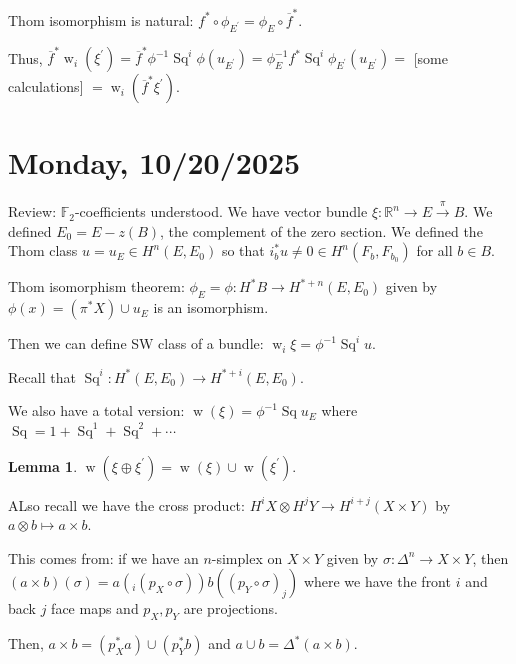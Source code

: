 \documentclass{article}
\theoremstyle{definition}
\newtheorem{lemma}[theorem]{Lemma}
\begin{document}
    Thom isomorphism is natural: \(f^{\ast} \circ \phi_{E^{\prime}} = \phi_E \circ \overline{f}^{\ast}\).
    
    Thus, \(\overline{f}^{\ast} \operatorname{w}_i(\xi^{\prime}) = \overline{f}^{\ast} \phi ^{-1} \operatorname{Sq}^i \phi(u_{E^{\prime}}) = \phi_E ^{-1} f^{\ast} \operatorname{Sq}^i \phi_{E^{\prime}}(u_{E^{\prime}}) =\) [some calculations] \(=\operatorname{w}_i(\overline{f}^{\ast} \xi ^{\prime} )\).

    \section*{Monday, 10/20/2025}
    
    Review: \(\mathbb{F}_2\)-coefficients understood. We have vector bundle \(\xi: \mathbb{R}^n \to E \xrightarrow{\pi} B\). We defined \(E_0 = E - z(B)\), the complement of the zero section. We defined the Thom class \(u = u_E \in H^n(E,E_0)\) so that \(i_b^{\ast} u \neq 0 \in H^n(F_b , F_{b_0})\) for all \(b\in B\).
    
    Thom isomorphism theorem: \(\phi_E = \phi : H^{\ast} B \to H^{\ast + n} (E,E_0)\) given by \(\phi(x) = (\pi^{\ast} X) \cup u_E\) is an isomorphism.

    Then we can define SW class of a bundle: \(\operatorname{w} _i \xi = \phi ^{-1} \operatorname{Sq}^i u\).

    Recall that \(\operatorname{Sq}^i: H^{\ast} (E,E_0) \to H^{\ast + i} (E, E_0)\).

    We also have a total version: \(\operatorname{w} (\xi) = \phi ^{-1} \operatorname{Sq} u_E\) where \(\operatorname{Sq} = 1 + \operatorname{Sq}^1 + \operatorname{Sq}^2 + \cdots\)

    \begin{lemma}
        \(\operatorname{w} (\xi \oplus \xi^{\prime}) = \operatorname{w} (\xi) \cup \operatorname{w} (\xi^{\prime})\).
    \end{lemma}

    ALso recall we have the cross product: \(H^i X \otimes H^j Y \to H^{i+j} (X \times Y)\) by \(a \otimes b \mapsto a \times b\).

    This comes from: if we have an \(n\)-simplex on \(X \times Y\) given by \(\sigma : \Delta^n \to X \times Y\), then \((a \times b)(\sigma) = a(_i(p_X \circ \sigma)) b((p_Y \circ \sigma)_j)\) where we have the front \(i\) and back \(j\) face maps and \(p_X , p_Y\) are projections.

    Then, \(a \times b = (p_X ^{\ast} a) \cup (p_Y^{\ast} b)\) and \(a\cup b = \Delta ^{\ast} (a \times b)\).
    
\end{document}
